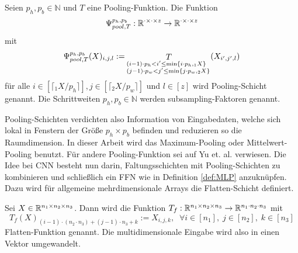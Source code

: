 \begin{defi}
    Seien $p_h, p_b \in \mathbb{N}$ und $T$ eine Pooling-Funktion. Die Funktion 
    \begin{equation*}
        \Psi_{pool,T}^{p_h,p_b}: \mathbb{R}^{\cdot \times \cdot \times z} \rightarrow \mathbb{R}^{\cdot \times \cdot\times z}
    \end{equation*}
    mit
    \begin{equation*}
        \Psi_{pool,T}^{p_h,p_b}(X)_{i,j,l}:= \mathop{T}_{\begin{subarray}{l}(i-1) \cdot p_h < i' \leq \min\{i \cdot p_h, {}_1 X\} \\ 
        (j-1) \cdot p_w < j' \leq \min\{j \cdot p_w, {}_2 X\}\end{subarray}} (X_{i',j',l})  
    \end{equation*}
    für alle  $i \in [\lceil {}_1 X/p_h \rceil], j \in [\lceil {}_2 X/p_w \rceil]$ und $l \in [z]$ wird Pooling-Schicht genannt. Die Schrittweiten $p_h, p_b \in \mathbb{N}$ werden subsampling-Faktoren genannt.
\end{defi}

Pooling-Schichten verdichten also Information von Eingabedaten, welche sich lokal in Fenstern der Größe $p_h \times p_b$ befinden und reduzieren so die Raumdimension. In dieser Arbeit wird das Maximum-Pooling oder Mittelwert-Pooling benutzt. Für andere Pooling-Funktion sei auf Yu et. al.\cite{yu2014mixed} verwiesen.
Die Idee bei CNN besteht nun darin, Faltungsschichten mit Pooling-Schichten zu kombinieren und schließlich ein FFN wie in Definition \ref{def:MLP} anzuknüpfen.
Dazu wird für allgemeine mehrdimensionale Arrays die Flatten-Schicht definiert.

\begin{defi}
    \label{def:flatten}
    Sei $X \in \mathbb{R}^{n_1 \times n_2 \times n_3}$. Dann wird die Funktion $T_f:\mathbb{R}^{n_1 \times n_2 \times n_3} \rightarrow \mathbb{R}^{n_1 \cdot n_2 \cdot n_3}$ mit 
    \begin{equation*}
        T_f(X)_{(i-1) \cdot (n_2 \cdot n_3)+(j-1) \cdot n_3+k}:= X_{i,j,k}, \; \; \forall i \in [n_1],\; j \in [n_2],\; k \in [n_3]
    \end{equation*}
    Flatten-Funktion genannt. Die multidimensionale Eingabe wird also in einen Vektor umgewandelt.
\end{defi}


